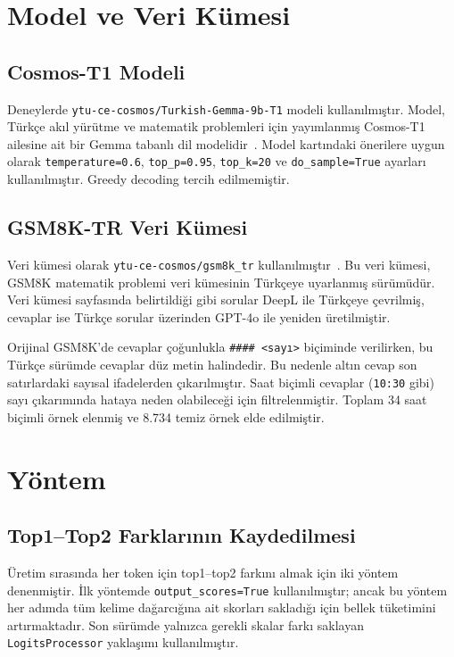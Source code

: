 \documentclass[conference]{IEEEtran}
\begin{document}
\section{Model ve Veri Kümesi}

\subsection{Cosmos-T1 Modeli}

Deneylerde \texttt{ytu-ce-cosmos/Turkish-Gemma-9b-T1} modeli kullanılmıştır.
Model, Türkçe akıl yürütme ve matematik problemleri için yayımlanmış Cosmos-T1
ailesine ait bir Gemma tabanlı dil modelidir~\cite{cosmos}. Model kartındaki
önerilere uygun olarak \texttt{temperature=0.6}, \texttt{top\_p=0.95},
\texttt{top\_k=20} ve \texttt{do\_sample=True} ayarları kullanılmıştır.
Greedy decoding tercih edilmemiştir.

\subsection{GSM8K-TR Veri Kümesi}

Veri kümesi olarak \texttt{ytu-ce-cosmos/gsm8k\_tr} kullanılmıştır~\cite{gsm8k_tr}.
Bu veri kümesi, GSM8K matematik problemi veri kümesinin Türkçeye uyarlanmış
sürümüdür. Veri kümesi sayfasında belirtildiği gibi sorular DeepL ile Türkçeye
çevrilmiş, cevaplar ise Türkçe sorular üzerinden GPT-4o ile yeniden
üretilmiştir.

Orijinal GSM8K'de cevaplar çoğunlukla \texttt{\#\#\#\# <sayı>} biçiminde
verilirken, bu Türkçe sürümde cevaplar düz metin halindedir. Bu nedenle altın
cevap son satırlardaki sayısal ifadelerden çıkarılmıştır. Saat biçimli cevaplar
(\texttt{10:30} gibi) sayı çıkarımında hataya neden olabileceği için filtrelenmiştir.
Toplam 34 saat biçimli örnek elenmiş ve 8.734 temiz örnek elde edilmiştir.

\section{Yöntem}

\subsection{Top1--Top2 Farklarının Kaydedilmesi}

Üretim sırasında her token için top1--top2 farkını almak için iki yöntem
denenmiştir. İlk yöntemde \texttt{output\_scores=True} kullanılmıştır; ancak bu
yöntem her adımda tüm kelime dağarcığına ait skorları sakladığı için bellek
tüketimini artırmaktadır. Son sürümde yalnızca gerekli skalar farkı saklayan
\texttt{LogitsProcessor} yaklaşımı kullanılmıştır.
\end{document}
